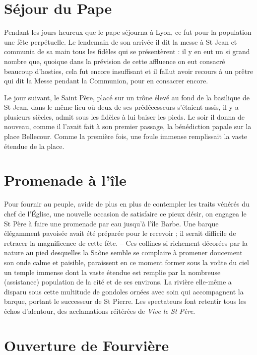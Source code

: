 \documentclass[11pt,a4paper]{report}
\begin{document}
\section*{Séjour du Pape}

Pendant les jours heureux que le pape séjourna à Lyon, ce fut pour la population une fête perpétuelle. Le lendemain de son arrivée il dit la messe à St Jean et communia de sa main tous les fidèles qui se présentèrent : il y en eut un si grand nombre que, quoique dans la prévision de cette affluence on eut consacré beaucoup d'hosties, cela fut encore insuffisant et il fallut avoir recours à un prêtre qui dit la Messe pendant la Communion, pour en consacrer encore.

Le jour suivant, le Saint Père, placé sur un trône élevé au fond de la basilique de St Jean, dans le même lieu où deux de ses prédécesseurs s'étaient assis, il y a plusieurs siècles, admit sous les fidèles à lui baiser les pieds. Le soir il donna de nouveau, comme il l'avait fait à son premier passage, la bénédiction papale sur la place Bellecour. Comme la première fois, une foule immense remplissait la vaste étendue de la place.

\section*{Promenade à l'île}

Pour fournir au peuple, avide de plus en plus de contempler les traits vénérés du chef de l'Église, une nouvelle occasion de satisfaire ce pieux désir, on engagea le St Père à faire une promenade par eau jusqu'à l'île Barbe. Une barque élégamment pavoisée avait été préparée pour le recevoir ; il serait difficile de retracer la magnificence de cette fête. -- Ces collines si richement décorées par la nature au pied desquelles la Saône semble se complaire à promener doucement son onde calme et paisible, paraissent en ce moment former sous la voûte du ciel un temple immense dont la vaste étendue est remplie par la nombreuse (assistance) population de la cité et de ses environs. La rivière elle-même a disparu sous cette multitude de gondoles ornées avec soin qui accompagnent la barque, portant le successeur de St Pierre. Les spectateurs font retentir tous les échos d'alentour, des acclamations réitérées de \textit{Vive le St Père}.

\section*{Ouverture de Fourvière}
\end{document}
